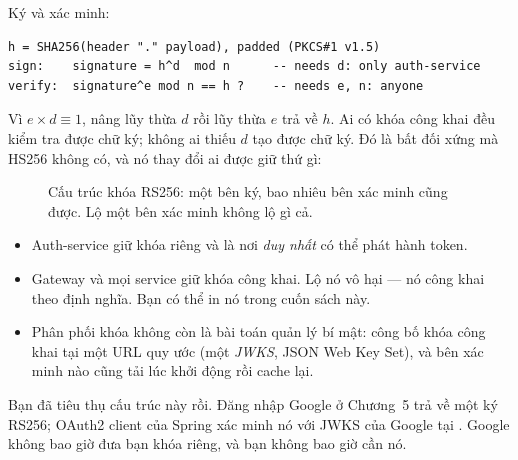 Ký và xác minh:

\begin{lstlisting}
h = SHA256(header "." payload), padded (PKCS#1 v1.5)
sign:    signature = h^d  mod n      -- needs d: only auth-service
verify:  signature^e mod n == h ?    -- needs e, n: anyone
\end{lstlisting}

Vì $e \times d \equiv 1$, nâng lũy thừa $d$ rồi lũy thừa $e$ trả về $h$.
Ai có khóa công khai đều kiểm tra được chữ ký; không ai thiếu $d$ tạo
được chữ ký. Đó là bất đối xứng mà HS256 không có, và nó thay đổi ai
được giữ thứ gì:

\begin{figure}[htb]
\centering
{}
\caption{Cấu trúc khóa RS256: một bên ký, bao nhiêu bên xác minh cũng
được. Lộ một bên xác minh không lộ gì cả.}
\label{fig:rs256-topology}
\end{figure}

\begin{itemize}
  \item Auth-service giữ khóa riêng và là nơi \emph{duy nhất} có thể
  phát hành token.
  \item Gateway và mọi service giữ khóa công khai. Lộ nó vô hại --- nó
  công khai theo định nghĩa. Bạn có thể in nó trong cuốn sách này.
  \item Phân phối khóa không còn là bài toán quản lý bí mật: công bố
  khóa công khai tại một URL quy ước (một \emph{JWKS}, JSON Web Key
  Set), và bên xác minh nào cũng tải lúc khởi động rồi cache lại.
\end{itemize}

Bạn đã tiêu thụ cấu trúc này rồi. Đăng nhập Google ở Chương~5 trả về
một  ký RS256; OAuth2 client của Spring xác minh nó với
JWKS của Google tại .
Google không bao giờ đưa bạn khóa riêng, và bạn không bao giờ cần nó.

